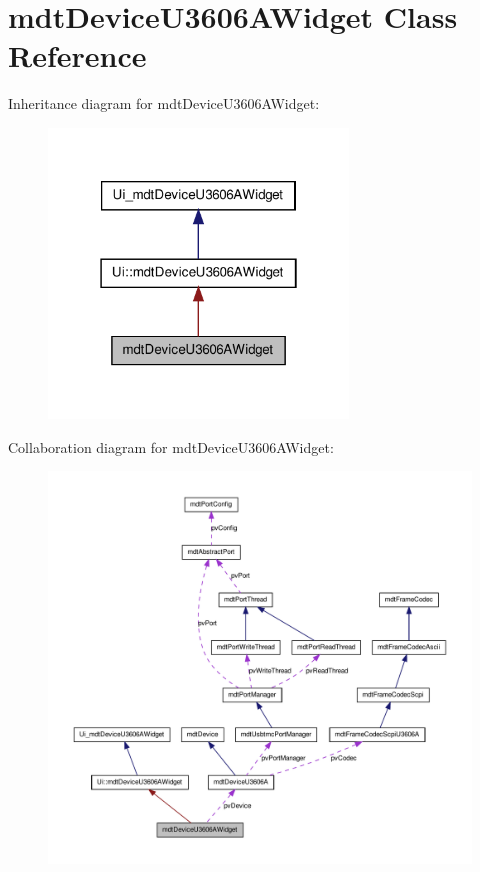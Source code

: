 \hypertarget{classmdt_device_u3606_a_widget}{
\section{mdtDeviceU3606AWidget Class Reference}
\label{classmdt_device_u3606_a_widget}
}


Inheritance diagram for mdtDeviceU3606AWidget:\nopagebreak
\begin{figure}[H]
\begin{center}
\leavevmode
\includegraphics[width=226pt]{classmdt_device_u3606_a_widget__inherit__graph}
\end{center}
\end{figure}


Collaboration diagram for mdtDeviceU3606AWidget:\nopagebreak
\begin{figure}[H]
\begin{center}
\leavevmode
\includegraphics[width=400pt]{classmdt_device_u3606_a_widget__coll__graph}
\end{center}
\end{figure}
